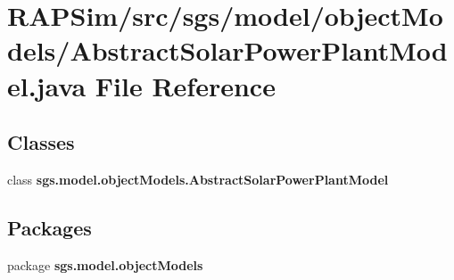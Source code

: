 \section{R\-A\-P\-Sim/src/sgs/model/object\-Models/\-Abstract\-Solar\-Power\-Plant\-Model.java File Reference}
\label{_abstract_solar_power_plant_model_8java}
\subsection*{Classes}
\begin{DoxyCompactItemize}
\item 
class {\bf sgs.\-model.\-object\-Models.\-Abstract\-Solar\-Power\-Plant\-Model}
\end{DoxyCompactItemize}
\subsection*{Packages}
\begin{DoxyCompactItemize}
\item 
package {\bf sgs.\-model.\-object\-Models}
\end{DoxyCompactItemize}

